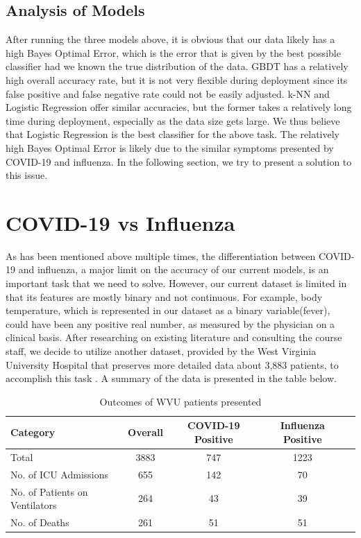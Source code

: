 \documentclass[a4paper, 11pt]{article}
\begin{document}
\subsection*{Analysis of Models}
After running the three models above, it is obvious that our data likely has a high Bayes Optimal Error, which is the error that is given by the best possible classifier had we known the true distribution of the data. GBDT has a relatively high overall accuracy rate, but it is not very flexible during deployment since its false positive and false negative rate could not be easily adjusted. k-NN and Logistic Regression offer similar accuracies, but the former takes a relatively long time during deployment, especially as the data size gets large. We thus believe that Logistic Regression is the best classifier for the above task.
The relatively high Bayes Optimal Error is likely due to the similar symptoms presented by COVID-19 and influenza. In the following section, we try to present a solution to this issue.

\section*{COVID-19 vs Influenza}
As has been mentioned above multiple times, the differentiation between COVID-19 and influenza, a major limit on the accuracy of our current models, is an important task that we need to solve. However, our current dataset is limited in that its features are mostly binary and not continuous. For example, body temperature, which is represented in our dataset as a binary variable(fever), could have been any positive real number, as measured by the physician on a clinical basis. After researching on existing literature and consulting the course staff, we decide to utilize another dataset, provided by the West Virginia University Hospital that preserves more detailed data about 3,883 patients, to accomplish this task \cite{influenza}. A summary of the data is presented in the table below.

\begin{table}[H]
\centering
\caption{Outcomes of WVU patients presented}
\begin{tabular}{| l | c | c | c | c |}
\hline
Category & Overall & COVID-19 Positive & Influenza Positive  \\ \hline
Total & 3883 & 747 & 1223  \\ \hline
No. of ICU Admissions & 655 & 142 & 70  \\ \hline
No. of Patients on Ventilators & 264 & 43 & 39  \\ \hline
No. of Deaths & 261 & 51 & 51  \\ 
\hline
\end{tabular}
\label{Table}
\end{table}
\end{document}
